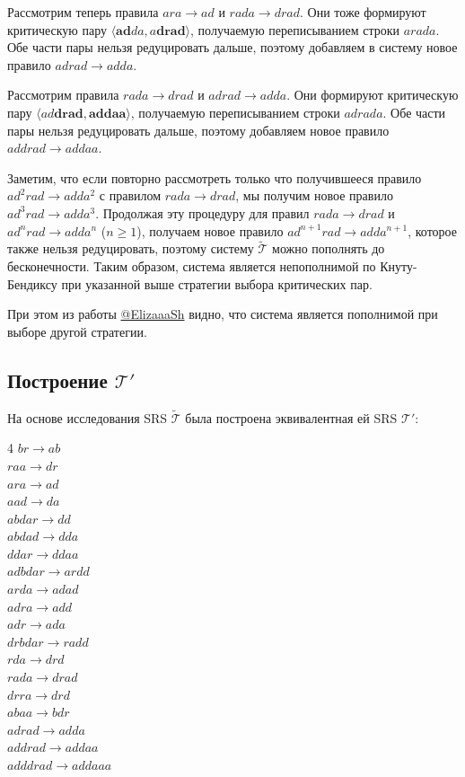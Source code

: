 \documentclass[a4paper, 12pt]{article}
\newcommand{\T}{\mathcal{T}}
\begin{document}
    Рассмотрим теперь правила $ara \to ad$ и $rada \to drad$. Они тоже формируют критическую пару $\langle \mathbf{ad}da, a\mathbf{drad} \rangle$, получаемую переписыванием строки $arada$. Обе части пары нельзя редуцировать дальше, поэтому добавляем в систему новое правило $adrad \to adda$.

    Рассмотрим правила $rada \to drad$ и $adrad \to adda$. Они формируют критическую пару $\langle ad\mathbf{drad}, \mathbf{addaa} \rangle$, получаемую переписыванием строки $adrada$. Обе части пары нельзя редуцировать дальше, поэтому добавляем новое правило $addrad \to addaa$.

    Заметим, что если повторно рассмотреть только что получившееся правило $ad^2rad \to adda^2$ с правилом $rada \to drad$, мы получим новое правило $ad^3 rad \to adda^3$. Продолжая эту процедуру для правил $rada \to drad$ и $ad^nrad \to adda^n$ ($n \geq 1$), получаем новое правило $ad^{n+1}rad \to adda^{n+1}$, которое также нельзя редуцировать, поэтому систему $\tilde{\T}$ можно пополнять до бесконечности. Таким образом, система является непополнимой по Кнуту-Бендиксу при указанной выше стратегии выбора критических пар. 

    При этом из работы \href{https://github.com/ElizaaaSh/TFL}{@ElizaaaSh} видно, что система является пополнимой при выборе другой стратегии.

    \subsection{Построение $\T'$}

    На основе исследования SRS $\tilde{\T}$ была построена эквивалентная ей SRS $\T'$:

    \begin{flushleft}
    \begin{multicols}{4}
    $br      \to ab$\\
    $raa     \to dr$\\
    $ara     \to ad$\\
    $aad     \to da$\\
    $abdar   \to dd$\\
    $abdad   \to dda$\\
    $ddar    \to ddaa$\\
    $adbdar  \to ardd$\\
    $arda    \to adad$\\
    $adra    \to add$\\
    $adr     \to ada$\\
    $drbdar  \to radd$\\
    $rda     \to drd$\\
    $rada    \to drad$\\
    $drra    \to drd$\\
    $abaa    \to bdr$\\
    $adrad   \to adda$\\
    $addrad  \to addaa$\\
    $adddrad \to addaaa$\\
    \end{multicols}
    \end{flushleft}
\end{document}
